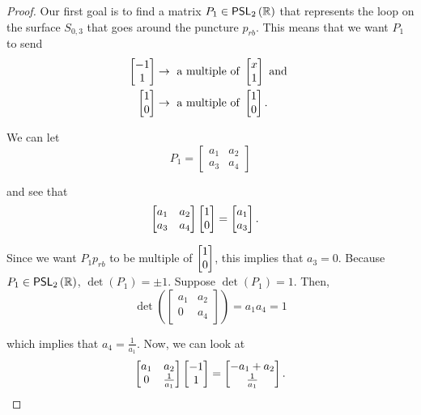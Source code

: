 \documentclass{amsart}
\begin{document}
\begin{proof}
		\begin{comment}
			\hl{the color-coded explanation should be in the caption of the figure. Say "In the math, I call these $p_{rg}$, $p_{gb}$, etc. and the back triangle lifts to points ... and $\hvec{x}{1}$ for some $x>1$. We wish to prove that $x=1$.}	
		\end{comment}
		
		Our first goal is to find a matrix $P_1 \in \mathsf{PSL}_{2}\left(\mathbb{R}\right)$ that represents the loop on the surface $S_{0,3}$ that goes around the puncture $p_{rb}$. This means that we want $P_1$ to send
		\begin{align*}
			\begin{bmatrix} -1 \\ 1 \end{bmatrix} & \to \text{ a multiple of } \begin{bmatrix} x \\ 1 \end{bmatrix} \text{ and }\\
			\begin{bmatrix} 1 \\ 0 \end{bmatrix} & \to \text{ a multiple of } \begin{bmatrix} 1 \\ 0 \end{bmatrix}.
		\end{align*}
		
		We can let 
		\begin{equation*}
			P_1 = 
			\begin{bmatrix}
				a_1 & a_2 \\
				a_3 & a_4
			\end{bmatrix}
		\end{equation*}
		
		and see that
		\begin{align*}
			\begin{bmatrix}
				a_1 & a_2 \\
				a_3 & a_4
			\end{bmatrix}
			\begin{bmatrix} 1 \\ 0 \end{bmatrix} &= \begin{bmatrix} a_1 \\ a_3 \end{bmatrix}.	
		\end{align*}
		
		Since we want $P_1 p_{rb}$ to be multiple of $\begin{bmatrix} 1 \\ 0 \end{bmatrix}$, this implies that $a_3 = 0$. Because $P_1 \in \mathsf{PSL}_{2}\left(\mathbb{R}\right)$, $\det(P_1) = \pm 1$. Suppose $\det(P_1) = 1$. Then,
		\begin{equation*}
			\det\left(
			\begin{bmatrix}
				a_1 & a_2 \\
				0 & a_4
			\end{bmatrix}
			\right) = a_1a_4 = 1
		\end{equation*}
		
		which implies that $a_4 = \frac{1}{a_1}$. Now, we can look at
		\begin{equation*}
			\begin{bmatrix}
				a_1 & a_2 \\
				0 & \frac{1}{a_1}
			\end{bmatrix}
			\begin{bmatrix} -1 \\ 1 \end{bmatrix} = \begin{bmatrix} -a_1 + a_2 \\ \frac{1}{a_1} \end{bmatrix}.
		\end{equation*}
		

\end{proof}
\end{document}
